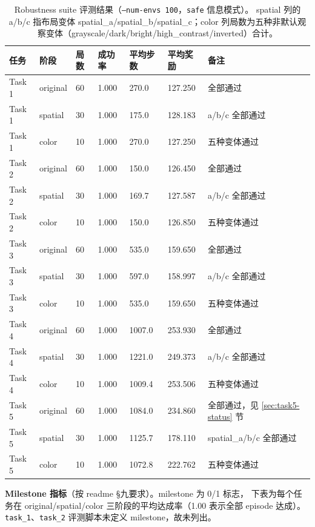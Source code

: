\documentclass[12pt,a4paper]{ctexart}
\begin{document}
\begin{table}[H]
\centering
\begin{tabular}{p{}p{}p{}p{}p{}p{}p{}}
\toprule
任务 & 阶段 & 局数 & 成功率 & 平均步数 & 平均奖励 & 备注 \\
\midrule
Task 1 & original & 60 & 1.000 & 270.0 & 127.250 & 全部通过 \\
Task 1 & spatial & 30 & 1.000 & 175.0 & 128.183 & a/b/c 全部通过 \\
Task 1 & color    & 10 & 1.000 & 270.0 & 127.250 & 五种变体通过 \\
\midrule
Task 2 & original & 60 & 1.000 & 150.0 & 126.450 & 全部通过 \\
Task 2 & spatial & 30 & 1.000 & 169.7 & 127.587 & a/b/c 全部通过 \\
Task 2 & color    & 10 & 1.000 & 150.0 & 126.850 & 五种变体通过 \\
\midrule
Task 3 & original & 60 & 1.000 & 535.0 & 159.650 & 全部通过 \\
Task 3 & spatial & 30 & 1.000 & 597.0 & 158.997 & a/b/c 全部通过 \\
Task 3 & color    & 10 & 1.000 & 535.0 & 159.650 & 五种变体通过 \\
\midrule
Task 4 & original & 60 & 1.000 & 1007.0 & 253.930 & 全部通过 \\
Task 4 & spatial & 30 & 1.000 & 1221.0 & 249.373 & a/b/c 全部通过 \\
Task 4 & color    & 10 & 1.000 & 1009.4 & 253.506 & 五种变体通过 \\
\midrule
Task 5 & original & 60 & 1.000 & 1084.0 & 234.860 & 全部通过，见 \ref{sec:task5-status} 节 \\
Task 5 & spatial & 30 & 1.000 & 1125.7 & 178.110 & spatial\_a/b/c 全部通过 \\
Task 5 & color    & 10 & 1.000 & 1072.8 & 222.762 & 五种变体通过 \\
\bottomrule
\end{tabular}
\caption{Robustness suite 评测结果（\texttt{--num-envs 100}，\texttt{safe} 信息模式）。
spatial 列的 a/b/c 指布局变体 spatial\_a/spatial\_b/spatial\_c；color 列局数为五种非默认观察变体（grayscale/dark/bright/high\_contrast/inverted）合计。}
\end{table}

\textbf{Milestone 指标}（按 readme §九要求）。milestone 为 0/1 标志，
下表为每个任务在 original/spatial/color 三阶段的平均达成率（1.00 表示全部 episode 达成）。
\texttt{task\_1}、\texttt{task\_2} 评测脚本未定义 milestone，故未列出。
\end{document}
